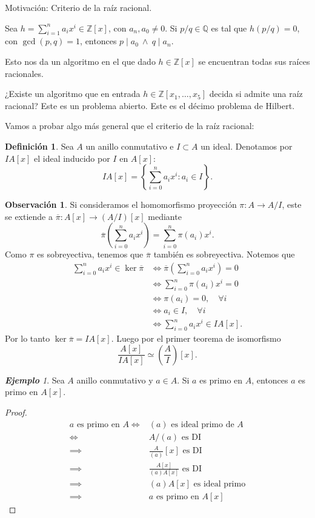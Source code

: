 \documentclass{article}
\theoremstyle{definition}
\newtheorem{definition}[theorem]{Definición}
\newtheorem*{obs}{Observación}
\theoremstyle{remark}
\newtheorem{example}[theorem]{\textbf{Ejemplo}}
\numberwithin{equation}{section}
\newcommand{\Q}{\mathbb{Q}}
\newcommand{\Z}{\mathbb{Z}}
\renewcommand{\bar}{\overline}
\newcommand{\br}[1]{\left( #1 \right)}
\newcommand{\set}[1]{\left\{ #1 \right\}}
\newcommand{\olon}{\colon}
\begin{document}
Motivación: Criterio de la raíz racional.

Sea $h = \sum_{i=1}^n a_i x^i \in \Z[x]$, con $a_n,a_0 \neq 0$.
Si $p/q \in \Q$ es tal que $h(p/q) = 0$, con $\gcd(p,q) = 1$, entonces $p \mid a_0 \ \land \ q \mid a_n$.

Esto nos da un algoritmo en el que dado $h \in \Z[x]$ se encuentran todas sus raíces racionales.

¿Existe un algoritmo que en entrada $h \in \Z[x_1,\dots,x_5]$ decida si admite una raíz racional? Este es un problema abierto. Este es el décimo problema de Hilbert.

Vamos a probar algo más general que el criterio de la raíz racional:

\begin{definition}
  Sea $A$ un anillo conmutativo e $I \subset A$ un ideal. Denotamos por $IA[x]$ el ideal inducido por $I$ en $A[x]$:
  \[ IA[x] = \set{\sum_{i=0}^n a_i x^i : a_i \in I}. \]
\end{definition}

\begin{obs}
  Si consideramos el homomorfismo proyección $\pi \colon A \to A/I$, este se extiende a $\bar\pi \olon A[x] \to (A/I)[x]$ mediante
  \[ \bar\pi\br{\sum_{i=0}^n a_i x^i} = \sum_{i=0}^n \pi(a_i)x^i. \]
  Como $\pi$ es sobreyectiva, tenemos que $\bar\pi$ también es sobreyectiva. Notemos que
  \begin{align*}
      \sum_{i=0}^n a_i x^i \in \ker\bar\pi
      &\iff \bar\pi\br{\sum_{i=0}^n a_i x^i} = 0 \\
      &\iff \sum_{i=0}^n \pi(a_i) x^i = 0 \\
      &\iff \pi(a_i) = 0, \quad \forall i \\
      &\iff a_i \in I, \quad \forall i \\
      &\iff \sum_{i=0}^n a_i x^i \in IA[x].
  \end{align*}
  Por lo tanto $\ker\bar\pi = IA[x]$. Luego por el primer teorema de isomorfismo
  \[ \frac{A[x]}{IA[x]} \simeq \br{\frac{A}{I}}[x]. \]
\end{obs}

\begin{example}
  Sea $A$ anillo conmutativo y $a \in A$. Si $a$ es primo en $A$, entonces $a$ es primo en $A[x]$.
\end{example}
\begin{proof}
  \begin{align*}
    \text{$a$ es primo en $A$}
    \iff &\text{$(a)$ es ideal primo de $A$} \\
    \iff &\text{$A/(a)$ es DI} \\
    \implies &\frac{A}{(a)}[x] \text{ es DI} \\
    \implies & \frac{A[x]}{(a)A[x]} \text{ es DI} \\
    \implies & \text{$(a)A[x]$ es ideal primo} \\
    \implies &\text{$a$ es primo en $A[x]$}
  \end{align*}
\end{proof}
\end{document}
